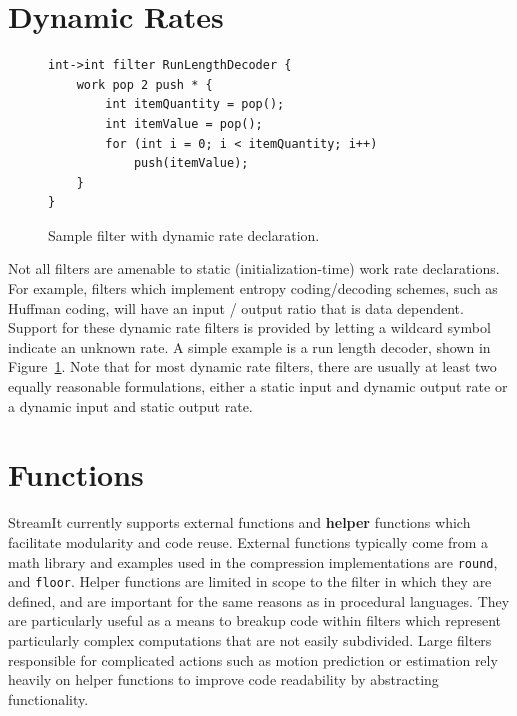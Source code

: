 \section{Dynamic Rates}

\begin{figure}
  \begin{center}
    \begin{minipage}{3.5in}
      \begin{small}
        \begin{verbatim}
int->int filter RunLengthDecoder {
    work pop 2 push * {
        int itemQuantity = pop();
        int itemValue = pop();
        for (int i = 0; i < itemQuantity; i++)
            push(itemValue);
    }
}
        \end{verbatim}
      \end{small}
    \end{minipage}
  \end{center}
  \caption{Sample filter with dynamic rate declaration.}
  \label{fig:runlength-decode}
\end{figure}

Not all filters are amenable to static (initialization-time) work rate declarations. 
For example, filters which implement entropy coding/decoding schemes, 
such as Huffman coding,
will have an input / output ratio that is data dependent. Support for these
dynamic rate filters is provided by letting a wildcard {\tt *} symbol indicate an unknown rate.
A simple example is a run length decoder, shown in Figure~\ref{fig:runlength-decode}. Note that for
most dynamic rate filters, there are usually at least two equally reasonable formulations, either a static input and dynamic output rate or a dynamic input and static output rate.

\section{Functions}
StreamIt currently supports external functions and \textbf{helper} 
functions which facilitate modularity and code reuse. 
External functions typically come from a math library and 
examples used in the compression implementations are {\tt round}, 
and {\tt floor}. Helper functions are limited in scope to the 
filter in which they are defined, and are important for the same 
reasons as in procedural languages. They are particularly useful 
as a means to breakup code within filters which represent  
particularly complex computations that are not easily subdivided. 
Large filters responsible for complicated actions such as motion 
prediction or estimation rely heavily on helper functions to 
improve code readability by abstracting functionality.